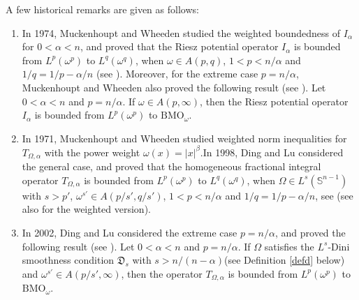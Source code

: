 \documentclass[preprint,10pt]{elsarticle}
\numberwithin{equation}{section}
\begin{document}
A few historical remarks are given as follows:
\begin{enumerate}
  \item In 1974, Muckenhoupt and Wheeden studied the weighted boundedness of $I_{\alpha}$ for $0<\alpha<n$, and proved that the Riesz potential operator $I_{\alpha}$ is bounded from $L^p(\omega^p)$ to $L^q(\omega^q)$, when $\omega\in A(p,q)$, $1<p<n/{\alpha}$ and $1/q=1/p-{\alpha}/n$ (see \cite[Theorem 2]{muckenhoupt2}). Moreover, for the extreme case $p=n/{\alpha}$, Muckenhoupt and Wheeden also proved the following result (see \cite[Theorem 7]{muckenhoupt2}). Let $0<\alpha<n$ and $p=n/{\alpha}$. If $\omega\in A(p,\infty)$, then the Riesz potential operator $I_{\alpha}$ is bounded from $L^p(\omega^p)$ to $\mathrm{BMO}_{\omega}$.
  \item In 1971, Muckenhoupt and Wheeden \cite{muckenhoupt1} studied weighted norm inequalities for $T_{\Omega,\alpha}$ with the power weight $\omega(x)=|x|^\beta$.In 1998, Ding and Lu considered the general case, and proved that the homogeneous fractional integral operator $T_{\Omega,\alpha}$ is bounded from $L^p(\omega^p)$ to $L^q(\omega^q)$, when $\Omega\in L^s(\mathbb{S}^{n-1})$ with $s>p'$, $\omega^{s'}\in A(p/{s'},q/{s'})$, $1<p<n/{\alpha}$ and $1/q=1/p-{\alpha}/n$, see \cite[Theorem 1]{ding1}(see also \cite[Chapter 3]{lu} for the weighted version).
  \item In 2002, Ding and Lu considered the extreme case $p=n/{\alpha}$, and proved the following result (see \cite[Theorem 1]{ding2}). Let $0<\alpha<n$ and $p=n/{\alpha}$. If $\Omega$ satisfies the $L^s$-Dini smoothness condition $\mathfrak{D}_{s}$ with $s>n/{(n-\alpha)}$(see Definition \ref{defd} below) and $\omega^{s'}\in A(p/{s'},\infty)$, then the operator $T_{\Omega,\alpha}$ is bounded from $L^p(\omega^p)$ to $\mathrm{BMO}_{\omega}$.
\end{enumerate}
\end{document}
